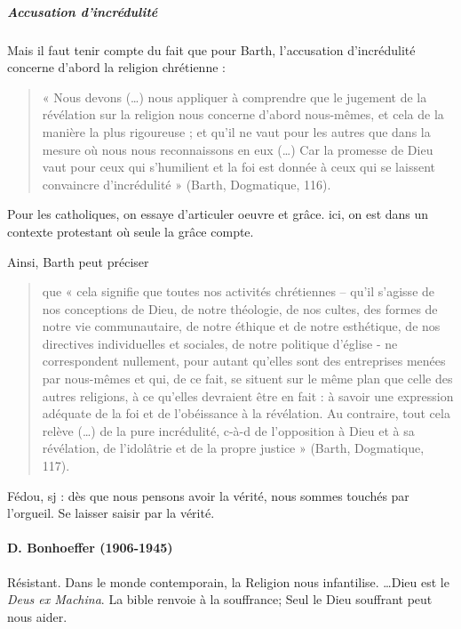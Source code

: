 \subparagraph{Accusation d'incrédulité} Mais  il  faut  tenir  compte  du  fait  que  pour  Barth,  l’accusation  d’incrédulité  concerne  d’abord  la  religion chrétienne  :  
\begin{quote}
   «  Nous  devons  (…)  nous  appliquer  à  comprendre  que  le  jugement  de  la  révélation  sur  la religion  nous  concerne  d’abord  nous-mêmes,  et  cela  de  la  manière  la  plus  rigoureuse  ;  et  qu’il  ne  vaut pour  les  autres  que  dans  la  mesure  où  nous  nous  reconnaissons  en  eux  (…)  Car  la  promesse  de  Dieu vaut  pour  ceux  qui  s’humilient  et  la  foi  est  donnée  à  ceux  qui  se  laissent  convaincre  d’incrédulité  » (Barth,  Dogmatique,  116). 
\end{quote}

Pour les catholiques, on essaye d'articuler oeuvre et grâce. ici, on est dans un contexte protestant où seule la grâce compte.


Ainsi,  Barth  peut  préciser 

\begin{quote}
     que  «  cela  signifie  que  toutes  nos  activités  chrétiennes  –  qu’il  s’agisse  de nos  conceptions  de  Dieu,  de  notre  théologie,  de  nos  cultes,  des  formes  de  notre  vie  communautaire,  de notre  éthique  et  de  notre  esthétique,  de  nos  directives  individuelles  et  sociales,  de  notre  politique d’église  -   ne  correspondent    nullement,  pour  autant  qu’elles  sont  des  entreprises  menées  par  nous-mêmes  et  qui,  de  ce  fait,  se  situent  sur  le  même  plan  que  celle  des  autres  religions,  à  ce  qu’elles devraient  être  en  fait  :  à  savoir  une  expression  adéquate  de  la  foi  et  de  l’obéissance  à  la  révélation.  Au contraire,  tout  cela  relève  (…)  de  la  pure  incrédulité,  c-à-d  de  l’opposition  à  Dieu  et  à  sa  révélation,  de l’idolâtrie  et de  la  propre  justice  »  (Barth,  Dogmatique,  117). 
\end{quote}

Fédou, sj : dès que nous pensons avoir la vérité, nous sommes touchés par l'orgueil. Se laisser saisir par la vérité.


\paragraph{D. Bonhoeffer (1906-1945)} Résistant. 
Dans le monde contemporain, la Religion nous infantilise. \ldots Dieu est le \textit{Deus ex Machina}. La bible renvoie à la souffrance; Seul le Dieu souffrant peut nous aider.



